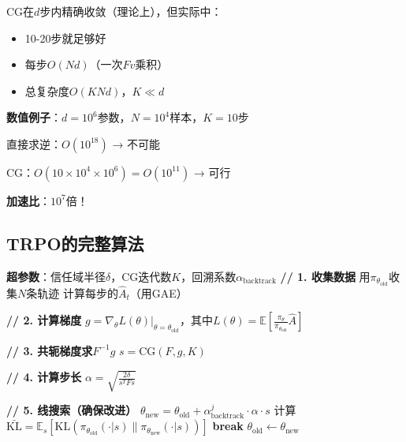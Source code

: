 \documentclass[11pt,a4paper]{article}
\theoremstyle{definition}
\begin{document}
\begin{calculation}[CG的收敛性]
CG在$d$步内精确收敛（理论上），但实际中：
\begin{itemize}
    \item 10-20步就足够好
    \item 每步$O(Nd)$（一次$Fv$乘积）
    \item 总复杂度$O(KNd)$，$K \ll d$
\end{itemize}

\textbf{数值例子}：$d = 10^6$参数，$N = 10^4$样本，$K = 10$步

直接求逆：$O(10^{18})$ → 不可能

CG：$O(10 \times 10^4 \times 10^6) = O(10^{11})$ → 可行

\textbf{加速比}：$10^7$倍！
\end{calculation}

\subsection{TRPO的完整算法}

\begin{algorithm}[H]
\caption{TRPO完整算法}
\begin{algorithmic}[1]
\State \textbf{超参数}：信任域半径$\delta$，CG迭代数$K$，回溯系数$\alpha_{\text{backtrack}}$
    \State \textbf{// 1. 收集数据}
    \State 用$\pi_{\theta_{\text{old}}}$收集$N$条轨迹
    \State 计算每步的$\hat{A}_t$（用GAE）
    
    \State \textbf{// 2. 计算梯度}
    \State $g = \nabla_\theta L(\theta)|_{\theta=\theta_{\text{old}}}$，其中$L(\theta) = \mathbb{E}\left[\frac{\pi_\theta}{\pi_{\theta_{\text{old}}}} \hat{A}\right]$
    
    \State \textbf{// 3. 共轭梯度求$F^{-1}g$}
    \State $s = \text{CG}(F, g, K)$ 
    
    \State \textbf{// 4. 计算步长}
    \State $\alpha = \sqrt{\frac{2\delta}{s^T F s}}$ 
    
    \State \textbf{// 5. 线搜索（确保改进）}
        \State $\theta_{\text{new}} = \theta_{\text{old}} + \alpha_{\text{backtrack}}^j \cdot \alpha \cdot s$
        \State 计算$\bar{\text{KL}} = \mathbb{E}_s[\text{KL}(\pi_{\theta_{\text{old}}}(\cdot|s) \| \pi_{\theta_{\text{new}}}(\cdot|s))]$
            \State \textbf{break}
        \EndIf
    \EndFor
    \State $\theta_{\text{old}} \leftarrow \theta_{\text{new}}$
\EndFor
\end{algorithmic}
\end{algorithm}
\end{document}

